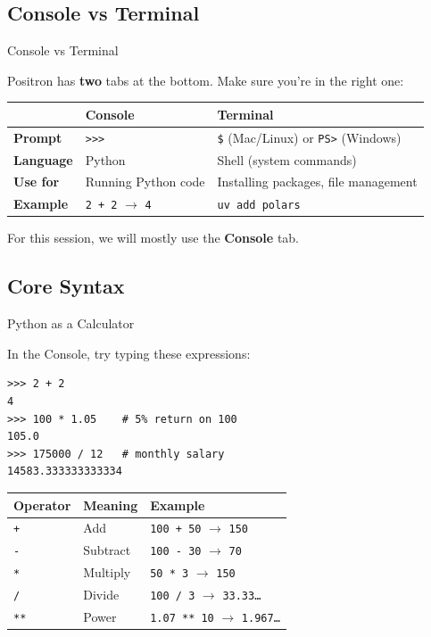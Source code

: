 \documentclass[9pt,aspectratio=169]{beamer}
\begin{document}
\subsection{Console vs Terminal}
\begin{frame}{Console vs Terminal}

Positron has \textbf{two} tabs at the bottom. Make sure you're in the right one:

\bigskip

\begin{tabular}{@{}lll@{}}
\toprule
 & \textbf{Console} & \textbf{Terminal} \\
\midrule
\textbf{Prompt} & \texttt{>>>} & \texttt{\$} (Mac/Linux) or \texttt{PS>} (Windows) \\[0.5em]
\textbf{Language} & Python & Shell (system commands) \\[0.5em]
\textbf{Use for} & Running Python code & Installing packages, file management \\[0.5em]
\textbf{Example} & \texttt{2 + 2} $\to$ \texttt{4} & \texttt{uv add polars} \\
\bottomrule
\end{tabular}

\bigskip

\begin{highlightbox}
\centering
For this session, we will mostly use the \textbf{Console} tab.
\end{highlightbox}

\end{frame}


\subsection{Core Syntax}
\begin{frame}[fragile]{Python as a Calculator}

In the Console, try typing these expressions:

\begin{lstlisting}[style=shell]
>>> 2 + 2
4
>>> 100 * 1.05    # 5% return on 100
105.0
>>> 175000 / 12   # monthly salary
14583.333333333334
\end{lstlisting}

\medskip

\begin{tabular}{@{}lll@{}}
\toprule
\textbf{Operator} & \textbf{Meaning} & \textbf{Example} \\
\midrule
\texttt{+} & Add & \texttt{100 + 50} $\to$ \texttt{150} \\
\texttt{-} & Subtract & \texttt{100 - 30} $\to$ \texttt{70} \\
\texttt{*} & Multiply & \texttt{50 * 3} $\to$ \texttt{150} \\
\texttt{/} & Divide & \texttt{100 / 3} $\to$ \texttt{33.33\ldots} \\
\texttt{**} & Power & \texttt{1.07 ** 10} $\to$ \texttt{1.967\ldots} \\
\bottomrule
\end{tabular}

\end{frame}
\end{document}
